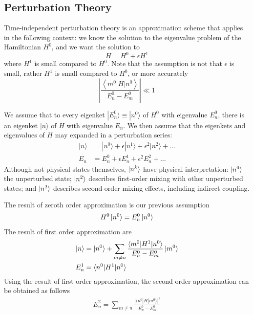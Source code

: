 \documentclass[../../../main.tex]{subfiles}
\begin{document}
\subsection{Perturbation Theory}
Time-independent perturbation theory is an approximation scheme that applies in the following context: we know the solution to the eigenvalue problem of the Hamiltonian $H^0$, and we want the solution to
\begin{equation*}
    H=H^0 +\epsilon H^1
\end{equation*}
where $H^1$ is small compared to $H^0$.
Note that the assumption is not that $\epsilon$ is small, rather $H^1$ is small compared to $H^0$, or more accurately
\begin{equation*}
    \left|\frac{\left\langle m^0 | H | n^0 \right\rangle}{E_n^0 - E_m^0} \right| \ll 1
\end{equation*}

We assume that to every eigenket $|E_n^0\rangle \equiv |n^0\rangle$ of $H^0$ with eigenvalue $E_n^0$, there is an eigenket $|n\rangle$ of $H$ with eigenvalue $E_n$.
We then assume that the eigenkets and eigenvalues of $H$ may expanded in a perturbation series:
\begin{align*}
    |n\rangle & =
    |n^{0}\rangle +\epsilon |n^{1}\rangle +\epsilon^2 |n^{2}\rangle + \dots \\
    E_n       & =
    E_n^{0} + \epsilon E_n^{1} +\epsilon^2 E_n^{2} + \dots
\end{align*}
Although not physical states themselves, $\ket{n^k}$ have physical interpretation: $\ket{n^0}$ the unperturbed state;  $\ket{n^2}$ describes first-order mixing with other unperturbed states;  and $\ket{n^2}$ describes second-order mixing effects, including indirect coupling.

The result of zeroth order approximation is our previous assumption
\begin{equation*}
    H^0 \ket{n^0}=E_n^0 \ket{n ^0}
\end{equation*}
The result of first order approximation are
\begin{align*}
    \ket{n}
          & =\ket{n^0}+\sum_{m \neq n} \frac{ \braket{m^{0} | H^{1} | n^{0} }}{E^{0}_n - E^{0}_m}\ket{m^0} \\
    E^1_n & =  \langle n^0 | H^1 | n^0 \rangle
\end{align*}
Using the result of first order approximation, the second order approximation can be obtained as follows
\begin{align*}
    E_n^{2} = \sum_{m \neq n} \frac{|\langle n^0 | H | m^0 \rangle|^2}{E^0_n - E^0_m}
\end{align*}
\end{document}
